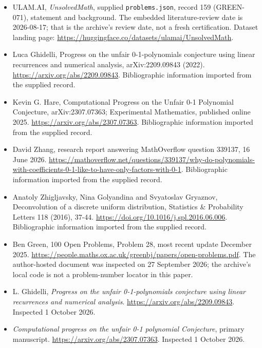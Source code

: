 \documentclass[11pt,a4paper]{article}
\begin{document}
{\small

\begin{itemize}

\item[\hypertarget{source:159:1}{S1}] ULAM.AI, \emph{UnsolvedMath}, supplied \texttt{problems.json}, record 159 (GREEN-071), statement and background. The embedded literature-review date is 2026-08-17; that is the archive’s review date, not a fresh certification. Dataset landing page: \url{https://huggingface.co/datasets/ulamai/UnsolvedMath}.

\item[\hypertarget{source:159:2}{S2}] Luca Ghidelli, Progress on the unfair 0-1-polynomials conjecture using linear recurrences and numerical analysis, arXiv:2209.09843 (2022). \url{https://arxiv.org/abs/2209.09843}. Bibliographic information imported from the supplied record.

\item[\hypertarget{source:159:3}{S3}] Kevin G. Hare, Computational Progress on the Unfair 0-1 Polynomial Conjecture, arXiv:2307.07363; Experimental Mathematics, published online 2025. \url{https://arxiv.org/abs/2307.07363}. Bibliographic information imported from the supplied record.

\item[\hypertarget{source:159:4}{S4}] David Zhang, research report answering MathOverflow question 339137, 16 June 2026. \url{https://mathoverflow.net/questions/339137/why-do-polynomials-with-coefficients-0-1-like-to-have-only-factors-with-0-1}. Bibliographic information imported from the supplied record.

\item[\hypertarget{source:159:5}{S5}] Anatoly Zhigljavsky, Nina Golyandina and Svyatoslav Gryaznov, Deconvolution of a discrete uniform distribution, Statistics \& Probability Letters 118 (2016), 37-44. \url{https://doi.org/10.1016/j.spl.2016.06.006}. Bibliographic information imported from the supplied record.

\item[\hypertarget{source:159:6}{S6}] Ben Green, 100 Open Problems, Problem 28, most recent update December 2025. \url{https://people.maths.ox.ac.uk/greenbj/papers/open-problems.pdf}. The author-hosted document was inspected on 27 September 2026; the archive’s local code is not a problem-number locator in this paper.

\item[E1] L. Ghidelli, \emph{Progress on the unfair 0-1-polynomials conjecture using linear recurrences and numerical analysis}. \url{https://arxiv.org/abs/2209.09843}. Inspected 1 October 2026.

\item[E2] \emph{Computational progress on the unfair 0-1 polynomial Conjecture}, primary manuscript. \url{https://arxiv.org/abs/2307.07363}. Inspected 1 October 2026.

\end{itemize}

}

\label{end:159}
\end{document}
